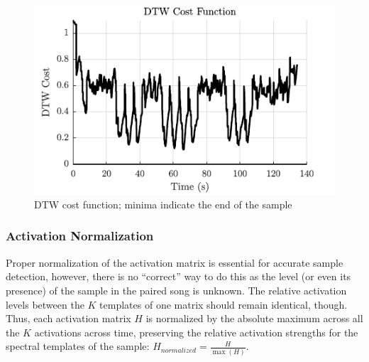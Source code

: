 \documentclass{article}
\begin{document}
\begin{figure}[t]
\centering
\includegraphics[width=\linewidth]{cost.pdf}
\caption{DTW cost function; minima indicate the end of the sample}
\label{fig3}
\end{figure}

\subsubsection{Activation Normalization}
Proper normalization of the activation matrix is essential for accurate sample detection, however, there is no ``correct'' way to do this as the level (or even its presence) of the sample in the paired song is unknown. The relative activation levels between the $K$ templates of one matrix should remain identical, though. Thus, each activation matrix $H$ is normalized by the absolute maximum across all the $K$ activations across time, preserving the relative activation strengths for the spectral templates of the sample:
%
$H_{normalized} = \frac{H}{\max(H)}$.
%
\end{document}
